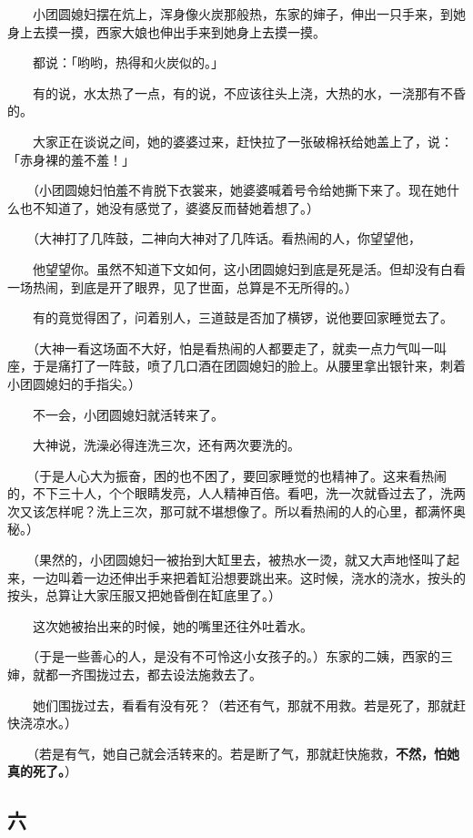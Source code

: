 \documentclass[UTF8]{ctexart}
\begin{document}
　　小团圆媳妇摆在炕上，浑身像火炭那般热，东家的婶子，伸出一只手来，到她身上去摸一摸，西家大娘也伸出手来到她身上去摸一摸。

　　都说：「哟哟，热得和火炭似的。」

　　有的说，水太热了一点，有的说，不应该往头上浇，大热的水，一浇那有不昏的。

　　大家正在谈说之间，她的婆婆过来，赶快拉了一张破棉袄给她盖上了，说：「赤身裸的羞不羞！」

　　（小团圆媳妇怕羞不肯脱下衣裳来，她婆婆喊着号令给她撕下来了。现在她什么也不知道了，她没有感觉了，婆婆反而替她着想了。）

　　（大神打了几阵鼓，二神向大神对了几阵话。看热闹的人，你望望他，

　　他望望你。虽然不知道下文如何，这小团圆媳妇到底是死是活。但却没有白看一场热闹，到底是开了眼界，见了世面，总算是不无所得的。）

　　有的竟觉得困了，问着别人，三道鼓是否加了横锣，说他要回家睡觉去了。

　　（大神一看这场面不大好，怕是看热闹的人都要走了，就卖一点力气叫一叫座，于是痛打了一阵鼓，喷了几口酒在团圆媳妇的脸上。从腰里拿出银针来，刺着小团圆媳妇的手指尖。）

　　不一会，小团圆媳妇就活转来了。

　　大神说，洗澡必得连洗三次，还有两次要洗的。

　　（于是人心大为振奋，困的也不困了，要回家睡觉的也精神了。这来看热闹的，不下三十人，个个眼睛发亮，人人精神百倍。看吧，洗一次就昏过去了，洗两次又该怎样呢？洗上三次，那可就不堪想像了。所以看热闹的人的心里，都满怀奥秘。）

　　（果然的，小团圆媳妇一被抬到大缸里去，被热水一烫，就又大声地怪叫了起来，一边叫着一边还伸出手来把着缸沿想要跳出来。这时候，浇水的浇水，按头的按头，总算让大家压服又把她昏倒在缸底里了。）

　　这次她被抬出来的时候，她的嘴里还往外吐着水。

　　（于是一些善心的人，是没有不可怜这小女孩子的。）东家的二姨，西家的三婶，就都一齐围拢过去，都去设法施救去了。

　　她们围拢过去，看看有没有死？（若还有气，那就不用救。若是死了，那就赶快浇凉水。）

　　（若是有气，她自己就会活转来的。若是断了气，那就赶快施救，\textbf{不然，怕她真的死了。}）

\subsection{六}
\end{document}

